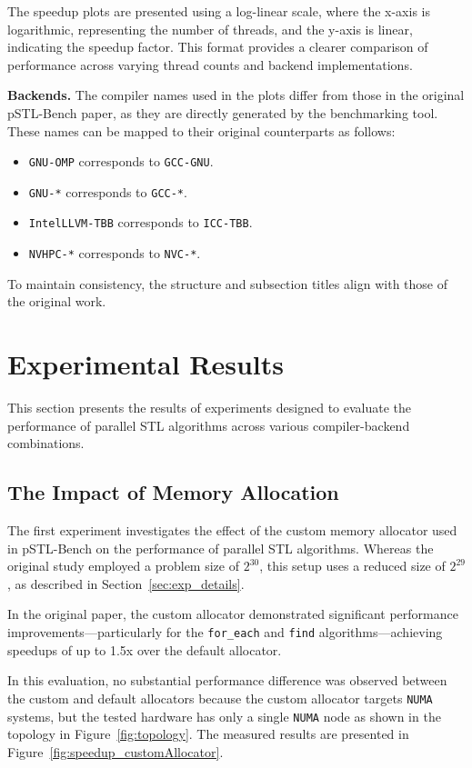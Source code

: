\documentclass[sigconf]{acmart}
\newcommand{\mypar}[1]{{\bf #1.}}
\begin{document}
The speedup plots are presented using a log-linear scale, where the x-axis is
logarithmic, representing the number of threads, and the y-axis is linear,
indicating the speedup factor. This format provides a clearer comparison of
performance across varying thread counts and backend implementations.

\mypar{Backends} The compiler names used in the plots differ from those in the original
pSTL-Bench paper, as they are directly generated by the benchmarking tool.
These names can be mapped to their original counterparts as follows:
\begin{itemize}
      \item \texttt{GNU-OMP} corresponds to \texttt{GCC-GNU}.
      \item \texttt{GNU-*} corresponds to \texttt{GCC-*}.
      \item \texttt{IntelLLVM-TBB} corresponds to \texttt{ICC-TBB}.
      \item \texttt{NVHPC-*} corresponds to \texttt{NVC-*}.
\end{itemize}

To maintain consistency, the structure and subsection titles align with those
of the original work.

\section{Experimental Results}

This section presents the results of experiments designed to evaluate the
performance of parallel STL algorithms across various compiler-backend
combinations.

\subsection{The Impact of Memory Allocation}

The first experiment investigates the effect of the custom memory allocator
used in pSTL-Bench on the performance of parallel STL algorithms. Whereas the
original study employed a problem size of $2^{30}$, this setup uses a reduced
size of $2^{29}$, as described in Section~\ref{sec:exp_details}.

In the original paper, the custom allocator demonstrated significant
performance improvements—particularly for the \texttt{for\_each} and
\texttt{find} algorithms—achieving speedups of up to 1.5x over the default
allocator.

In this evaluation, no substantial performance difference was observed between
the custom and default allocators because the custom allocator targets
\texttt{NUMA} systems, but the tested hardware has only a single \texttt{NUMA}
node as shown in the topology in Figure~\ref{fig:topology}. The measured
results are presented in Figure~\ref{fig:speedup_customAllocator}.
\end{document}
